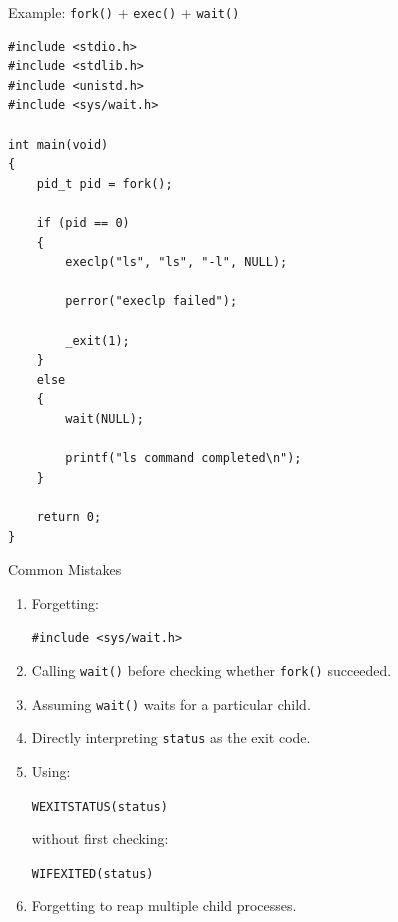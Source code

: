 \documentclass[aspectratio=169]{beamer}
\begin{document}
\begin{frame}[fragile]{Example: \texttt{fork()} + \texttt{exec()} + \texttt{wait()}}

\begin{lstlisting}[style=cstyle]
#include <stdio.h>
#include <stdlib.h>
#include <unistd.h>
#include <sys/wait.h>

int main(void)
{
    pid_t pid = fork();

    if (pid == 0)
    {
        execlp("ls", "ls", "-l", NULL);

        perror("execlp failed");

        _exit(1);
    }
    else
    {
        wait(NULL);

        printf("ls command completed\n");
    }

    return 0;
}
\end{lstlisting}

\end{frame}

\begin{frame}{Common Mistakes}

\begin{enumerate}

    \item Forgetting:
    \begin{center}
    \texttt{\#include <sys/wait.h>}
    \end{center}

    \item Calling \texttt{wait()} before checking whether
    \texttt{fork()} succeeded.

    \item Assuming \texttt{wait()} waits for a particular child.

    \item Directly interpreting \texttt{status} as the exit code.

    \item Using:
    \begin{center}
    \texttt{WEXITSTATUS(status)}
    \end{center}
    without first checking:
    \begin{center}
    \texttt{WIFEXITED(status)}
    \end{center}

    \item Forgetting to reap multiple child processes.

\end{enumerate}

\end{frame}
\end{document}

